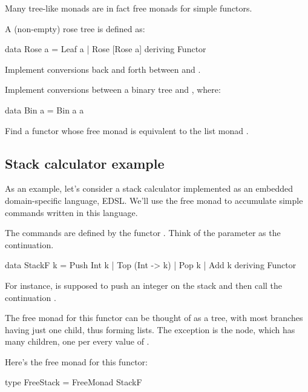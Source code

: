 \documentclass[DaoFP]{subfiles}
\begin{document}
Many tree-like monads are in fact free monads for simple functors.

\begin{exercise}
A (non-empty) rose tree is defined as:
\begin{haskell}
data Rose a = Leaf a | Rose [Rose a]
  deriving Functor
\end{haskell}
Implement conversions back and forth between  and  .
\end{exercise}

\begin{exercise}
Implement conversions between a binary tree and , where:
\begin{haskell}
data Bin a = Bin a a
\end{haskell}
\end{exercise}

\begin{exercise}
Find a functor whose free monad is equivalent to the list monad \hask{[a]}.
\end{exercise}


\subsection{Stack calculator example}
As an example, let's consider a stack calculator implemented as an embedded domain-specific language, EDSL. We'll use the free monad to accumulate simple commands written in this language. 

The commands are defined by the functor . Think of the parameter   as the continuation. 
\begin{haskell}
data StackF k  = Push Int k
               | Top (Int -> k)
               | Pop k            
               | Add k
               deriving Functor
\end{haskell}
For instance,  is supposed to push an integer on the stack and then call the continuation .

The free monad for this functor can be thought of as a tree, with most branches having just one child, thus forming lists. The exception is the  node, which has many children, one per every value of .

Here's the free monad for this functor:
\begin{haskell}
type FreeStack = FreeMonad StackF
\end{haskell}
\end{document}

